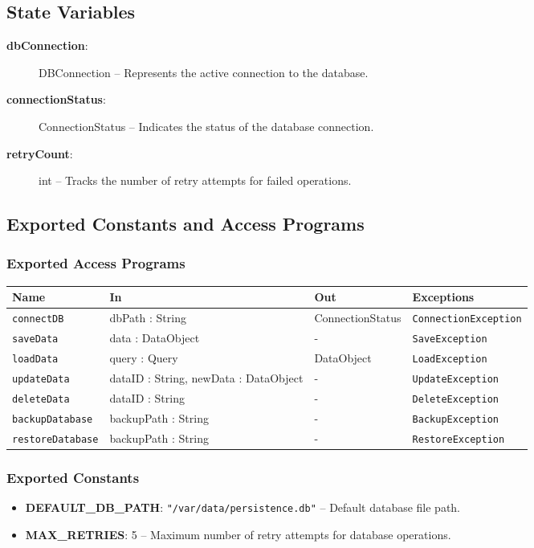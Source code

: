 \documentclass[12pt, titlepage]{article}
\begin{document}
\subsection{State Variables}
\begin{description}
    \item[\textbf{dbConnection}:] DBConnection -- Represents the active connection to the database.
    \item[\textbf{connectionStatus}:] ConnectionStatus -- Indicates the status of the database connection.
    \item[\textbf{retryCount}:] int -- Tracks the number of retry attempts for failed operations.
\end{description}

\subsection{Exported Constants and Access Programs}

\subsubsection{Exported Access Programs}
\begin{center}
  \begin{tabular}{|l|l|l|l|}
    \hline
    \textbf{Name} & \textbf{In} & \textbf{Out} & \textbf{Exceptions} \\
    \hline 
    \texttt{connectDB} & dbPath : String & ConnectionStatus & \texttt{ConnectionException} \\
    \hline
    \texttt{saveData} & data : DataObject & - & \texttt{SaveException} \\
    \hline
    \texttt{loadData} & query : Query & DataObject & \texttt{LoadException} \\
    \hline
    \texttt{updateData} & dataID : String, newData : DataObject & - & \texttt{UpdateException} \\
    \hline
    \texttt{deleteData} & dataID : String & - & \texttt{DeleteException} \\
    \hline
    \texttt{backupDatabase} & backupPath : String & - & \texttt{BackupException} \\
    \hline
    \texttt{restoreDatabase} & backupPath : String & - & \texttt{RestoreException} \\
    \hline
  \end{tabular}
\end{center}

\subsubsection{Exported Constants}
\begin{itemize}
    \item \textbf{DEFAULT\_DB\_PATH}: \texttt{"/var/data/persistence.db"} -- Default database file path.
    \item \textbf{MAX\_RETRIES}: 5 -- Maximum number of retry attempts for database operations.
\end{itemize}
\end{document}
